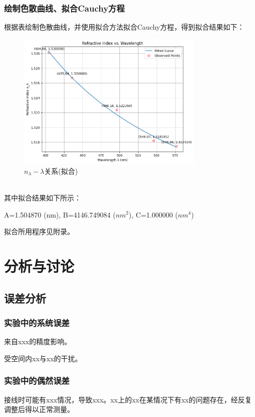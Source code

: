 \documentclass[UTF8]{ctexart}
\begin{document}
\subsubsection{绘制色散曲线、拟合Cauchy方程}
根据表绘制色散曲线，并使用拟合方法拟合Cauchy方程，得到拟合结果如下：
\\
\begin{figure}[h]
    \centering
    \includegraphics[width=0.8\textwidth]{fit.png}
    \caption{\(n_\lambda - \lambda\)关系(拟合)}
    \label{fig:fit}
\end{figure}
\\
其中拟合结果如下所示：
\begin{center}
    A=1.504870 (nm), B=4146.749084 (\(nm^2\)), C=1.000000 (\(nm^4\))
\end{center}
拟合所用程序见附录。
\section{分析与讨论}

\subsection{误差分析}

\subsubsection{实验中的系统误差}
来自xxx的精度影响。

受空间内xx与xx的干扰。

\subsubsection{实验中的偶然误差}
接线时可能有xxx情况，导致xxx。xx上的xx在某情况下有xx的问题存在，经反复调整后得以正常测量。
\end{document}
